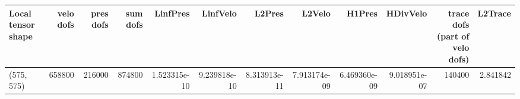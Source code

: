 \begin{tabular}{lrrrrrrrrrrr}
\toprule
Local tensor shape &  velo dofs &  pres dofs &  sum dofs &     LinfPres &     LinfVelo &       L2Pres &       L2Velo &       H1Pres &     HDivVelo &  trace dofs (part of velo dofs) &  L2Trace \\
\midrule
        (575, 575) &     658800 &     216000 &    874800 & 1.523315e-10 & 9.239818e-10 & 8.313913e-11 & 7.913174e-09 & 6.469360e-09 & 9.018951e-07 &                          140400 & 2.841842 \\
\bottomrule
\end{tabular}

